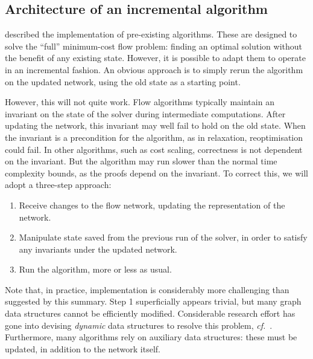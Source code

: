 \subsection{Architecture of an incremental algorithm}

 described the implementation of pre-existing algorithms. These are designed to solve the ``full'' minimum-cost flow problem: finding an optimal solution without the benefit of any existing state. However, it is possible to adapt them to operate in an incremental fashion. An obvious approach is to simply rerun the algorithm on the updated network, using the old state as a starting point.

However, this will not quite work. Flow algorithms typically maintain an invariant on the state of the solver during intermediate computations. After updating the network, this invariant may well fail to hold on the old state. When the invariant is a precondition for the algorithm, as in relaxation, reoptimisation could fail. In other algorithms, such as cost scaling, correctness is not dependent on the invariant. But the algorithm may run slower than the normal time complexity bounds, as the proofs depend on the invariant. To correct this, we will adopt a three-step approach:

\begin{enumerate}
    \item Receive changes to the flow network, updating the representation of the network.
    \item Manipulate state saved from the previous run of the solver, in order to satisfy any invariants under the updated network.
    \item Run the algorithm, more or less as usual.
\end{enumerate}

Note that, in practice, implementation is considerably more challenging than suggested by this summary. Step 1 superficially appears trivial, but many graph data structures cannot be efficiently modified. Considerable research effort has gone into devising \emph{dynamic} data structures to resolve this problem, \textit{cf.\@}~\cite{Tarjan:1983,Eppstein:1996}. Furthermore, many algorithms rely on auxiliary data structures\footnotemark: these must be updated, in addition to the network itself.

